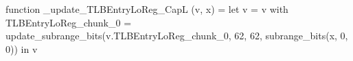 function _update_TLBEntryLoReg_CapL (v, x) = let v = { v with TLBEntryLoReg_chunk_0 = update_subrange_bits(v.TLBEntryLoReg_chunk_0, 62, 62, subrange_bits(x, 0, 0)) } in
  v
